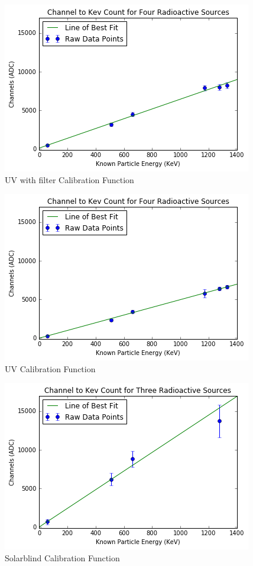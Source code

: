 \begin{figure}
  \centering
    \includegraphics[width=.8\columnwidth]{chanf.png}
  \caption{UV with filter Calibration Function}
  \label{fig:chanf}
\end{figure} 

\begin{figure}
  \centering
    \includegraphics[width=.8\columnwidth]{chanuv.png}
  \caption{UV Calibration Function}
  \label{fig:chanuv}
\end{figure} 

\begin{figure}
  \centering
    \includegraphics[width=.8\columnwidth]{chansb.png}
  \caption{Solarblind Calibration Function}
  \label{fig:chansb}
\end{figure} 

